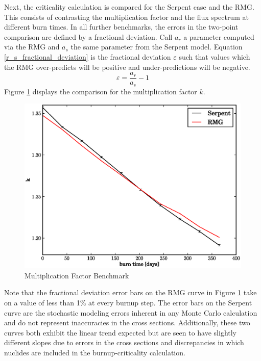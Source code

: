 Next, the criticality calculation is compared for the Serpent case and the RMG.  This consists of 
contrasting the multiplication factor and the flux spectrum at different burn times.  In all further
benchmarks, the errors in the two-point comparison are defined by a fractional deviation.  Call $a_r$ 
a parameter computed via the RMG and $a_s$ the same parameter from the Serpent model.  Equation 
\ref{r_s_fractional_deviation} is the fractional deviation $\varepsilon$ such that values which the RMG
over-predicts will be positive and under-predictions will be negative.
\begin{equation}
\label{r_s_fractional_deviation}
\varepsilon = \frac{a_r}{a_s} - 1
\end{equation}
Figure \ref{k_compare} displays the comparison for the multiplication factor $k$.  
\begin{figure}[htbp]
\caption{Multiplication Factor Benchmark}
\label{k_compare}
\begin{center}
\includegraphics[scale=0.5]{multigroup_method/figs/benchmark/k.eps}
\end{center}
\end{figure}
Note that the fractional deviation error bars on the RMG curve in Figure \ref{k_compare} 
take on a value of less than 1\% at every burnup step.  
The error bars on the Serpent curve are the stochastic modeling errors inherent in any Monte
Carlo calculation and do not represent inaccuracies in the cross sections.
Additionally, these two curves both exhibit the linear trend expected but are seen to have slightly 
different slopes due to errors in the cross sections and discrepancies in which nuclides are included in 
the burnup-criticality calculation.

